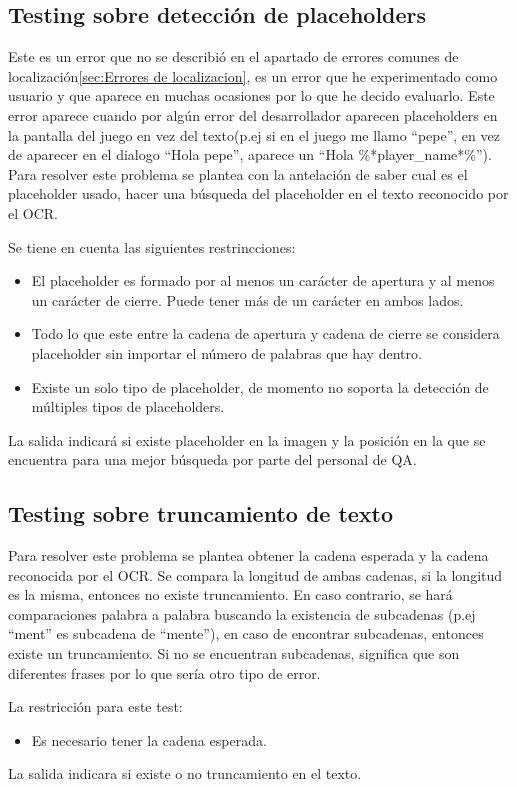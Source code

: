 \subsection{Testing sobre detección de placeholders}
Este es un error que no se describió en el apartado de errores comunes de localización\ref{sec:Errores de localizacion}, es un error que he experimentado como usuario y que aparece en muchas ocasiones por lo que he decido evaluarlo. Este error aparece cuando por algún error del desarrollador aparecen placeholders en la pantalla del juego en vez del texto(p.ej si en el juego me llamo ``pepe'', en vez de aparecer en el dialogo ``Hola pepe'', aparece un ``Hola \%*player\_name*\%'').
Para resolver este problema se plantea con la antelación de saber cual es el placeholder usado, hacer una búsqueda del placeholder en el texto reconocido por el OCR.

Se tiene en cuenta las siguientes restrincciones:
\begin{itemize}
	\item El placeholder es formado por al menos un carácter de apertura y al menos un carácter de cierre. Puede tener más de un carácter en ambos lados.
	\item Todo lo que este entre la cadena de apertura y cadena de cierre se considera placeholder sin importar el número de palabras que hay dentro.
	\item Existe un solo tipo de placeholder, de momento no soporta la detección de múltiples tipos de placeholders.
\end{itemize}
La salida indicará si existe placeholder en la imagen y la posición en la que se encuentra para una mejor búsqueda por parte del personal de QA.
\subsection{Testing sobre truncamiento de texto}

Para resolver este problema se plantea obtener la cadena esperada y la cadena reconocida por el OCR. Se compara la longitud de ambas cadenas, si la longitud es la misma, entonces no existe truncamiento. En caso contrario, se hará comparaciones palabra a palabra buscando la existencia de subcadenas (p.ej ``ment'' es subcadena de ``mente''), en caso de encontrar subcadenas, entonces existe un truncamiento. Si no se encuentran subcadenas, significa que son diferentes frases por lo que sería otro tipo de error.

La restricción para este test:
\begin{itemize}
	\item Es necesario tener la cadena esperada.
\end{itemize}
La salida indicara si existe o no truncamiento en el texto.

